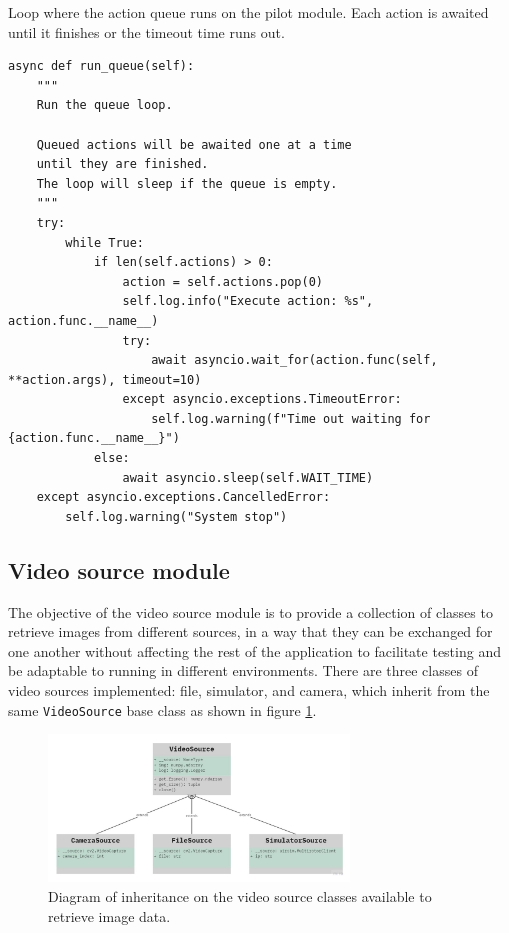 \begin{listing}[h!]
    \caption{Loop where the action queue runs on the pilot module. Each action is awaited until it finishes or the timeout time runs out.}{}
    \label{lst:pilot.queue}
    \begin{verbatim}
async def run_queue(self):
    """
    Run the queue loop.
    
    Queued actions will be awaited one at a time
    until they are finished.
    The loop will sleep if the queue is empty.
    """
    try:
        while True:
            if len(self.actions) > 0:
                action = self.actions.pop(0)
                self.log.info("Execute action: %s", action.func.__name__)
                try:
                    await asyncio.wait_for(action.func(self, **action.args), timeout=10)
                except asyncio.exceptions.TimeoutError:
                    self.log.warning(f"Time out waiting for {action.func.__name__}")
            else:
                await asyncio.sleep(self.WAIT_TIME)
    except asyncio.exceptions.CancelledError:
        self.log.warning("System stop")
    \end{verbatim}
\end{listing}


\subsection{Video source module}
\label{subsec:viz-source-module}

The objective of the video source module is to provide a collection of classes to retrieve images from different sources,
in a way that they can be exchanged for one another without affecting the rest of the application to facilitate testing and be adaptable to running in different environments.
There are three classes of video sources implemented: file, simulator, and camera, which inherit from the same \texttt{VideoSource} base class as shown in figure \ref{fig:video-source-inheritance}.

\begin{figure}
  \centering
  \includegraphics[width=8cm, keepaspectratio]{img/uml-video-source.jpg}
  \caption{Diagram of inheritance on the video source classes available to retrieve image data.}
  \label{fig:video-source-inheritance}
\end{figure}

